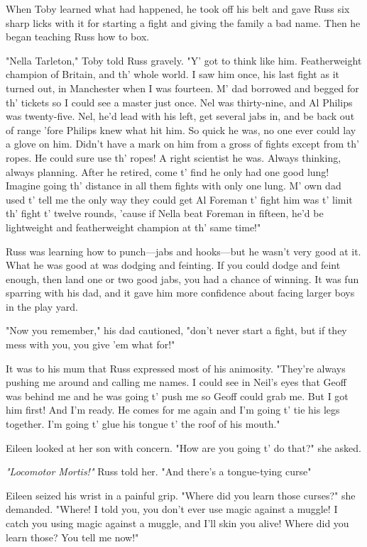 When Toby learned what had happened, he took off his belt and gave Russ six sharp licks with it for starting a fight and giving the family a bad name. Then he began teaching Russ how to box.

"Nella Tarleton," Toby told Russ gravely. "Y' got to think like him. Featherweight champion of Britain, and th' whole world. I saw him once, his last fight as it turned out, in Manchester when I was fourteen. M' dad borrowed and begged for th' tickets so I could see a master just once. Nel was thirty-nine, and Al Philips was twenty-five. Nel, he'd lead with his left, get several jabs in, and be back out of range 'fore Philips knew what hit him. So quick he was, no one ever could lay a glove on him. Didn't have a mark on him from a gross of fights except from th' ropes. He could sure use th' ropes! A right scientist he was. Always thinking, always planning. After he retired, come t' find he only had one good lung! Imagine going th' distance in all them fights with only one lung. M' own dad used t' tell me the only way they could get Al Foreman t' fight him was t' limit th' fight t' twelve rounds, 'cause if Nella beat Foreman in fifteen, he'd be lightweight and featherweight champion at th' same time!"

Russ was learning how to punch—jabs and hooks—but he wasn't very good at it. What he was good at was dodging and feinting. If you could dodge and feint enough, then land one or two good jabs, you had a chance of winning. It was fun sparring with his dad, and it gave him more confidence about facing larger boys in the play yard.

"Now you remember," his dad cautioned, "don't never start a fight, but if they mess with you, you give 'em what for!"

It was to his mum that Russ expressed most of his animosity. "They're always pushing me around and calling me names. I could see in Neil's eyes that Geoff was behind me and he was going t' push me so Geoff could grab me. But I got him first! And I'm ready. He comes for me again and I'm going t' tie his legs together. I'm going t' glue his tongue t' the roof of his mouth."

Eileen looked at her son with concern. "How are you going t' do that?" she asked.

\emph{"Locomotor Mortis!"} Russ told her. "And there's a tongue-tying curse{\el}"

Eileen seized his wrist in a painful grip. "Where did you learn those curses?" she demanded. "Where! I told you, you don't ever use magic against a muggle! I catch you using magic against a muggle, and I'll skin you alive! Where did you learn those? You tell me now!"

